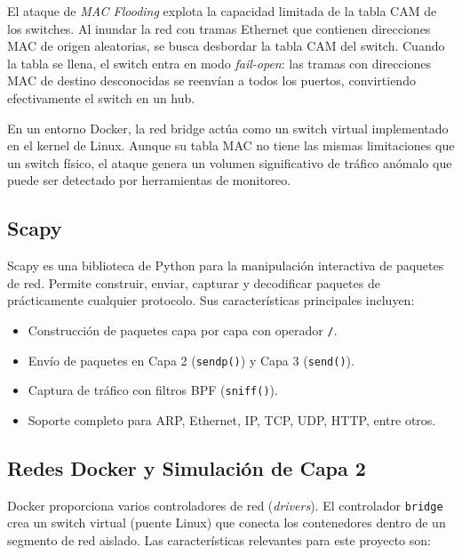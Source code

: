 \documentclass[12pt, a4paper]{article}
\begin{document}
El ataque de \textit{MAC Flooding} explota la capacidad limitada de la tabla CAM de los switches. Al inundar la red con tramas Ethernet que contienen direcciones MAC de origen aleatorias, se busca desbordar la tabla CAM del switch. Cuando la tabla se llena, el switch entra en modo \textit{fail-open}: las tramas con direcciones MAC de destino desconocidas se reenv\'ian a todos los puertos, convirtiendo efectivamente el switch en un hub.

En un entorno Docker, la red bridge act\'ua como un switch virtual implementado en el kernel de Linux. Aunque su tabla MAC no tiene las mismas limitaciones que un switch f\'isico, el ataque genera un volumen significativo de tr\'afico an\'omalo que puede ser detectado por herramientas de monitoreo.

\subsection{Scapy}

Scapy es una biblioteca de Python para la manipulaci\'on interactiva de paquetes de red. Permite construir, enviar, capturar y decodificar paquetes de pr\'acticamente cualquier protocolo. Sus caracter\'isticas principales incluyen:

\begin{itemize}[leftmargin=2cm]
    \item Construcci\'on de paquetes capa por capa con operador \texttt{/}.
    \item Env\'io de paquetes en Capa 2 (\texttt{sendp()}) y Capa 3 (\texttt{send()}).
    \item Captura de tr\'afico con filtros BPF (\texttt{sniff()}).
    \item Soporte completo para ARP, Ethernet, IP, TCP, UDP, HTTP, entre otros.
\end{itemize}

\subsection{Redes Docker y Simulaci\'on de Capa 2}

Docker proporciona varios controladores de red (\textit{drivers}). El controlador \texttt{bridge} crea un switch virtual (puente Linux) que conecta los contenedores dentro de un segmento de red aislado. Las caracter\'isticas relevantes para este proyecto son:
\end{document}
